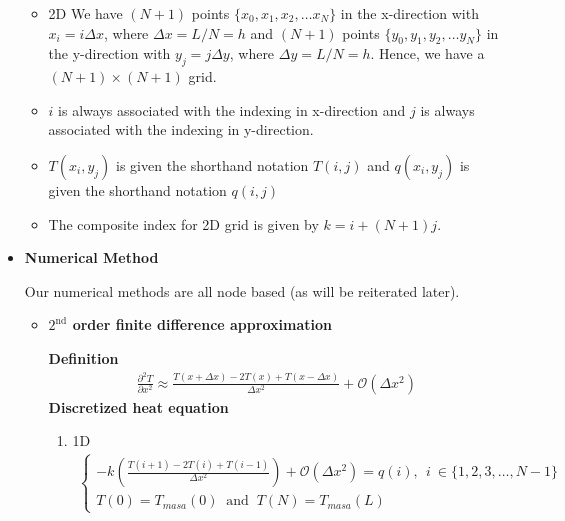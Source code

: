 \documentclass[12 pt, final]{article}
\begin{document}
\begin{itemize}
\begin{itemize}
            \item 2D We have $(N+1)$ points $\{x_0,x_1,x_2,\hdots x_N\}$ in the x-direction with $x_i=i\Delta x$, where $\Delta x = L/N = h$ and $(N+1)$ points $\{y_0,y_1,y_2,\hdots y_N\}$ in the y-direction with $y_j=j\Delta y$, where $\Delta y = L/N = h$. Hence, we have a $(N+1) \times (N+1)$ grid. 
            
            \item $i$ is always associated with the indexing in x-direction and $j$ is always associated with the indexing in y-direction.
            
            \item $T(x_i,y_j)$ is given the shorthand notation $T(i,j)$ and $q(x_i,y_j)$ is given the shorthand notation $q(i,j)$
            \item The composite index for 2D grid is given by $k = i + (N+1)j$.
        \end{itemize}
    \item \textbf{Numerical Method}
    
        Our numerical methods are all node based (as will be reiterated later).
        \begin{itemize}
            \item \textbf{$2^{\text{nd}}$ order finite difference approximation}
            
            \textbf{Definition}
            \begin{align*}
                \frac{\partial^2 T}{\partial x^2} \approx \frac{T(x+\Delta x)-2T(x)+T(x-\Delta x)}{\Delta x^2} + \mathcal{O}(\Delta x^2)
            \end{align*}
            \textbf{Discretized heat equation}
            \begin{enumerate}
            
                \item 1D
                \begin{align}
                \begin{cases}    -k\left(\frac{T(i+1)-2T(i)+T(i-1)}{\Delta x^2}\right) + \mathcal{O}(\Delta x^2) = q(i), \:\: i \:\in \{1,2,3,\hdots, N-1\}\\
                    T(0) = T_{masa} (0) \:\text{ and }\: T(N) = T_{masa} (L) \label{eq2}
                \end{cases}
                \end{align}
                

\end{enumerate}
\end{itemize}
\end{itemize}
\end{document}
